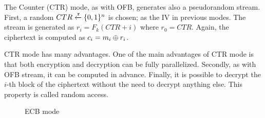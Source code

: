 \label{preliminaries:sym:modes:ctr}

The Counter (CTR) mode, as with OFB, generates also a pseudorandom stream. First, a random $CTR \xleftarrow{\mathtt{r}}{\{ 0, 1 \}^{n}}$ is chosen; as the IV in previous modes. The stream is generated as $r_i = F_k(CTR + i)$ where $r_0 = CTR$. Again, the ciphertext is computed as $c_i = m_i \oplus r_i$.

CTR mode has many advantages. One of the main advantages of CTR mode is that both encryption and decryption can be fully parallelized. Secondly, as with OFB stream, it can be computed in advance. Finally, it is possible to decrypt the $i$-th block of the ciphertext without the need to decrypt anything else. This property is called random access.

\begin{figure}[!ht]
    \centering
  \caption{ECB mode}
  \label{fig:sym:block:ecb}
\end{figure}

